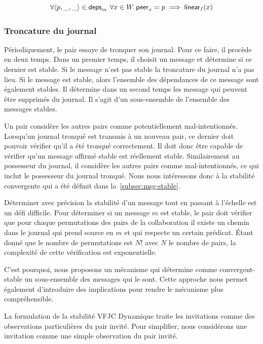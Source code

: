 \begin{equation*}
    \forall \tuple*{p, \_, \_} \in \trm{deps}_m \:\forall x \in W \qsep \trm{peer}_x = p \implies \trm{linear}_I(x)
\end{equation*}


\subsubsection{Troncature du journal}

Périodiquement, le pair essaye de tronquer son journal.
Pour ce faire, il procède en deux temps.
Dans un premier temps, il choisit un message et détermine si ce dernier est stable.
Si le message n'est pas stable la troncature du journal n'a pas lieu.
Si le message est stable, alors l'ensemble des dépendances de ce message sont également stables.
Il détermine dans un second temps les message qui peuvent être supprimés du journal.
Il s'agit d'un sous-ensemble de l'ensemble des messages stables.

Un pair considère les autres pairs comme potentiellement mal-intentionnés.
Lorsqu'un journal tronqué est transmis à un nouveau pair, ce dernier doit pouvoir vérifier qu'il a été tronqué correctement.
Il doit donc être capable de vérifier qu'un message affirmé stable est réellement stable.
Similairement au possesseur du journal, il considère les autres pairs comme mal-intentionnés, ce qui inclut le possesseur du journal tronqué.
Nous nous intéressons donc à la stabilité convergente qui a été définit dans la~\autoref{subsec:msg-stable}.

Déterminer avec précision la stabilité d'un message tout en passant à l'échelle est un défi difficile.
Pour déterminer si un message $m$ est stable, le pair doit vérifier que pour chaque permutations des pairs de la collaboration il existe un chemin dans le journal qui prend source en $m$ et qui respecte un certain prédicat.
Étant donné que le nombre de permutations est $N!$ avec $N$ le nombre de pairs, la complexité de cette vérification est exponentielle.

C'est pourquoi, nous proposons un mécanisme qui détermine comme convergent-stable un sous-ensemble des messages qui le sont.
Cette approche nous permet également d'introduire des implications pour rendre le mécanisme plus compréhensible.

La formulation de la stabilité \acl{VFJC} Dynamique traite les invitations comme des observations particulières du pair invité.
Pour simplifier, nous considérons une invitation comme une simple observation du pair invité.

